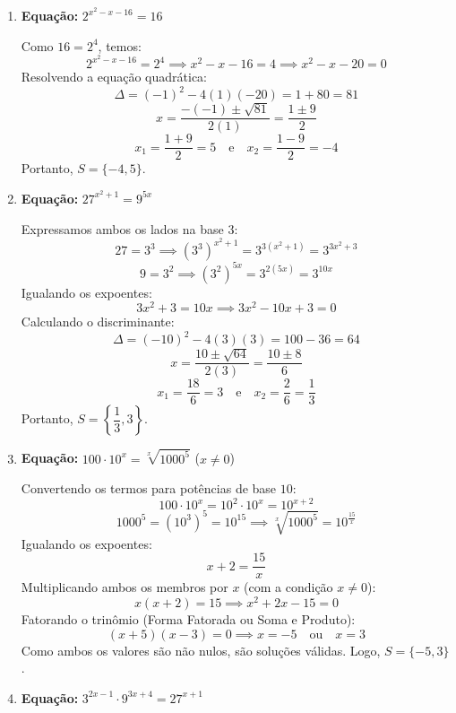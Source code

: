 \documentclass[12pt,a4paper]{report}
\begin{document}
\begin{enumerate}[label=\textbf{\arabic*.}]
	\vspace{0.5cm}
	
	\item \textbf{Equação:} $2^{x^2-x-16} = 16$
	
	Como $16 = 2^4$, temos:
	\[
	2^{x^2-x-16} = 2^4 \implies x^2 - x - 16 = 4 \implies x^2 - x - 20 = 0
	\]
	Resolvendo a equação quadrática:
	\[
	\Delta = (-1)^2 - 4(1)(-20) = 1 + 80 = 81
	\]
	\[
	x = \frac{-(-1) \pm \sqrt{81}}{2(1)} = \frac{1 \pm 9}{2}
	\]
	\[
	x_1 = \frac{1 + 9}{2} = 5 \quad \text{e} \quad x_2 = \frac{1 - 9}{2} = -4
	\]
	Portanto, $S = \{-4, 5\}$.
	
	\vspace{0.5cm}
	
	\item \textbf{Equação:} $27^{x^2+1} = 9^{5x}$
	
	Expressamos ambos os lados na base $3$:
	\[
	27 = 3^3 \implies \left( 3^3 \right)^{x^2+1} = 3^{3(x^2+1)} = 3^{3x^2+3}
	\]
	\[
	9 = 3^2 \implies \left( 3^2 \right)^{5x} = 3^{2(5x)} = 3^{10x}
	\]
	Igualando os expoentes:
	\[
	3x^2 + 3 = 10x \implies 3x^2 - 10x + 3 = 0
	\]
	Calculando o discriminante:
	\[
	\Delta = (-10)^2 - 4(3)(3) = 100 - 36 = 64
	\]
	\[
	x = \frac{10 \pm \sqrt{64}}{2(3)} = \frac{10 \pm 8}{6}
	\]
	\[
	x_1 = \frac{18}{6} = 3 \quad \text{e} \quad x_2 = \frac{2}{6} = \frac{1}{3}
	\]
	Portanto, $S = \left\{ \dfrac{1}{3}, 3 \right\}$.
	
	\vspace{0.5cm}
	
	\item \textbf{Equação:} $100 \cdot 10^x = \sqrt[x]{1000^5}$ \quad ($x \neq 0$)
	
	Convertendo os termos para potências de base $10$:
	\[
	100 \cdot 10^x = 10^2 \cdot 10^x = 10^{x+2}
	\]
	\[
	1000^5 = (10^3)^5 = 10^{15} \implies \sqrt[x]{1000^5} = 10^{\frac{15}{x}}
	\]
	Igualando os expoentes:
	\[
	x + 2 = \frac{15}{x}
	\]
	Multiplicando ambos os membros por $x$ (com a condição $x \neq 0$):
	\[
	x(x + 2) = 15 \implies x^2 + 2x - 15 = 0
	\]
	Fatorando o trinômio (Forma Fatorada ou Soma e Produto):
	\[
	(x + 5)(x - 3) = 0 \implies x = -5 \quad \text{ou} \quad x = 3
	\]
	Como ambos os valores são não nulos, são soluções válidas. Logo, $S = \{-5, 3\}$.
	
	\vspace{0.5cm}
	
	\item \textbf{Equação:} $3^{2x-1} \cdot 9^{3x+4} = 27^{x+1}$
	

\end{enumerate}
\end{document}
